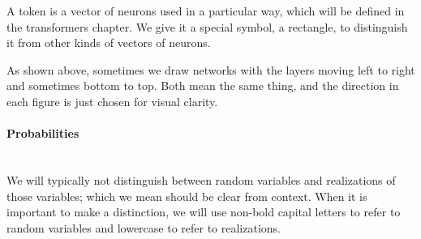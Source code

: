 \documentclass[12pt,letterpaper]{article}
\begin{document}
A token is a vector of neurons used in a particular way, which will be defined in the transformers chapter. We give it a special symbol, a rectangle, to distinguish it from other kinds of vectors of neurons.

As shown above, sometimes we draw networks with the layers moving left to right and sometimes bottom to top. Both mean the same thing, and the direction in each figure is just chosen for visual clarity.



\paragraph{Probabilities}\mbox{}\\
We will typically not distinguish between random variables and realizations of those variables; which we mean should be clear from context. When it is important to make a distinction, we will use non-bold capital letters to refer to random variables and lowercase to refer to realizations.
\end{document}
